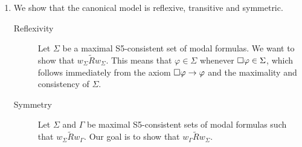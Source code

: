 \documentclass{article}
\begin{document}
\begin{ex}
\begin{enumerate}
\item We show that the canonical model is reflexive, transitive and symmetric.
\begin{description}
\item[Reflexivity] Let $\Sigma$ be a maximal \textsf{S5}-consistent set of
modal formulas. We want to show that $w_\Sigma\mathbin{\tilde{R}}w_\Sigma$.
This means that $\varphi\in\Sigma$ whenever $\square\varphi\in\Sigma$, which
follows immediately from the axiom $\square\varphi\to\varphi$ and the maximality
and consistency of $\Sigma$.
\item[Symmetry] Let $\Sigma$ and $\Gamma$ be maximal \textsf{S5}-consistent
sets of modal formulas such that $w_\Sigma\mathbin{\tilde{R}}w_\Gamma$. Our
goal is to show that $w_\Gamma\mathbin{\tilde{R}}w_\Sigma$. 
\end{description}
\end{enumerate}
\end{ex}
\end{document}

